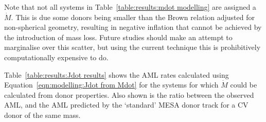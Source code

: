 
Note that not all systems in Table~\ref{table:results:mdot modelling} are assigned a $\dot M$.
This is due some donors being smaller than the Brown relation adjusted for non-spherical geometry, resulting in negative inflation that cannot be achieved by the introduction of mass loss. Future studies should make an attempt to marginalise over this scatter, but using the current technique this is prohibitively computationally expensive to do.

Table~\ref{table:results:Jdot results} shows the AML rates calculated using Equation~\ref{eqn:modelling:Jdot from Mdot} for the systems for which $\dot M$ could be calculated from donor properties. Also shown is the ratio between the observed AML, and the AML predicted by the `standard' MESA donor track for a CV donor of the same mass.

